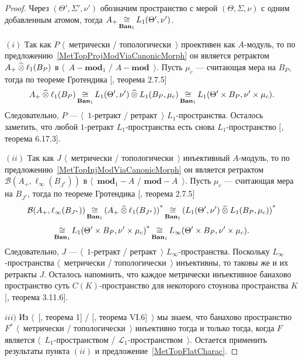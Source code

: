 \begin{proof} Через $(\Theta',\Sigma', \nu')$ обозначим пространство с мерой
$(\Theta,\Sigma, \nu)$ с одним добавленным атомом, тогда
$A_+\mathop{\mathbin{\cong}}\limits_{\mathbf{Ban}_1} L_1(\Theta',\nu')$.

$(i)$ Так как $P$ $\langle$~метрически / топологически~$\rangle$ проективен как
$A$-модуль, то по предложению~\ref{MetTopProjModViaCanonicMorph} он является
ретрактом $A_+\mathbin{\widehat{\otimes}} \ell_1(B_P)$ в $\langle$~$A-\mathbf{mod}_1$ /
$A-\mathbf{mod}$~$\rangle$. Пусть $\mu_c$ --- считающая мера на $B_P$, тогда по
теореме Гротендика [\cite{HelLectAndExOnFuncAn}, теорема 2.7.5]
$$
A_+\mathbin{\widehat{\otimes}}\ell_1(B_P)
\mathop{\mathbin{\cong}}\limits_{\mathbf{Ban}_1}L_1(\Theta',\nu')\mathbin{\widehat{\otimes}} L_1(B_P,\mu_c)
\mathop{\mathbin{\cong}}\limits_{\mathbf{Ban}_1}L_1(\Theta'\times B_P,\nu'\times \mu_c).
$$
Следовательно, $P$ --- $\langle$~$1$-ретракт / ретракт~$\rangle$
$L_1$-пространства. Осталось заметить, что любой $1$-ретракт $L_1$-пространства
есть снова $L_1$-пространство [\cite{LaceyIsomThOfClassicBanSp}, теорема
6.17.3].

$(ii)$ Так как $J$ $\langle$~метрически / топологически~$\rangle$ инъективный
$A$-модуль, то по предложению~\ref{MetTopInjModViaCanonicMorph} он является
ретрактом $\mathcal{B}(A_+,\ell_\infty(B_{J^*}))$ в $\langle$~$\mathbf{mod}_1-A$
/ $\mathbf{mod}-A$~$\rangle$. Пусть $\mu_c$ --- считающая мера на $B_{J^*}$,
тогда по теореме Гротендика [\cite{HelLectAndExOnFuncAn}, теорема 2.7.5]
$$
\mathcal{B}(A_+,\ell_\infty(B_{J^*}))
\mathop{\mathbin{\cong}}\limits_{\mathbf{Ban}_1}{(A_+\mathbin{\widehat{\otimes}} \ell_1(B_{J^*}))}^*
\mathop{\mathbin{\cong}}\limits_{\mathbf{Ban}_1}{(L_1(\Theta',\nu')\mathbin{\widehat{\otimes}} L_1(B_P,\mu_c))}^*
$$
$$
\mathop{\mathbin{\cong}}\limits_{\mathbf{Ban}_1}{L_1(\Theta'\times B_P,\nu'\times \mu_c)}^*
\mathop{\mathbin{\cong}}\limits_{\mathbf{Ban}_1}L_\infty(\Theta'\times B_P,\nu'\times \mu_c).
$$
Следовательно, $J$ --- $\langle$~$1$-ретракт / ретракт~$\rangle$
$L_\infty$-пространства. Поскольку $L_\infty$-пространства $\langle$~метрически
/ топологически~$\rangle$ инъективны, то таковы же и их ретракты $J$. Осталось
напомнить, что каждое метрически инъективное банахово пространство суть
$C(K)$-пространство для некоторого стоунова пространства $K$
[\cite{LaceyIsomThOfClassicBanSp}, теорема 3.11.6].

$iii)$ Из $\langle$~[\cite{GrothMetrProjFlatBanSp}, теорема 1] /
[\cite{StegRethNucOpL1LInfSp}, теорема VI.6]~$\rangle$ мы знаем, что банахово
пространство $F^*$ $\langle$~метрически / топологически~$\rangle$ инъективно
тогда и только тогда, когда $F$ является $\langle$~$L_1$-пространством /
$\mathscr{L}_1$-пространством~$\rangle$. Остается применить результаты пункта
$(ii)$ и предложение~\ref{MetTopFlatCharac}.
\end{proof}

